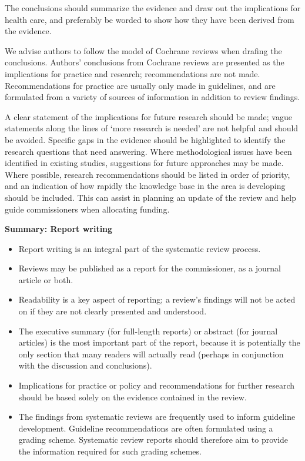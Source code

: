 \documentclass[
  10pt,
  a4paper,
  DIV=11,
  numbers=noendperiod]{scrreprt}
\begin{document}
The conclusions should summarize the evidence and draw out the
implications for health care, and preferably be worded to show how they
have been derived from the evidence.

We advise authors to follow the model of Cochrane reviews when drafing
the conclusions. Authors' conclusions from Cochrane reviews are
presented as the implications for practice and research; recommendations
are not made. Recommendations for practice are usually only made in
guidelines, and are formulated from a variety of sources of information
in addition to review findings.

A clear statement of the implications for future research should be
made; vague statements along the lines of `more research is needed' are
not helpful and should be avoided. Specific gaps in the evidence should
be highlighted to identify the research questions that need answering.
Where methodological issues have been identified in existing studies,
suggestions for future approaches may be made. Where possible, research
recommendations should be listed in order of priority, and an indication
of how rapidly the knowledge base in the area is developing should be
included. This can assist in planning an update of the review and help
guide commissioners when allocating funding.

\textbf{Summary: Report writing}

\begin{itemize}
\item
  Report writing is an integral part of the systematic review process.
\item
  Reviews may be published as a report for the commissioner, as a
  journal article or both.
\item
  Readability is a key aspect of reporting; a review's findings will not
  be acted on if they are not clearly presented and understood.
\item
  The executive summary (for full-length reports) or abstract (for
  journal articles) is the most important part of the report, because it
  is potentially the only section that many readers will actually read
  (perhaps in conjunction with the discussion and conclusions).
\item
  Implications for practice or policy and recommendations for further
  research should be based solely on the evidence contained in the
  review.
\item
  The findings from systematic reviews are frequently used to inform
  guideline development. Guideline recommendations are often formulated
  using a grading scheme. Systematic review reports should therefore aim
  to provide the information required for such grading schemes.
\end{itemize}
\end{document}
